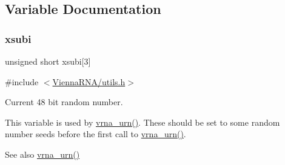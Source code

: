 \subsection{Variable Documentation}
\mbox{\label{group__utils_gaf9a866c8417afda7368bbac939ab3c47}} 
\subsubsection{\texorpdfstring{xsubi}{xsubi}}
{\footnotesize\ttfamily unsigned short xsubi\mbox{[}3\mbox{]}}



{\ttfamily \#include $<$\mbox{\hyperlink{utils_8h}{Vienna\+R\+N\+A/utils.\+h}}$>$}



Current 48 bit random number. 

This variable is used by \mbox{\hyperlink{group__utils_ga384e256ebb295d04a14426179db0dd6e}{vrna\+\_\+urn()}}. These should be set to some random number seeds before the first call to \mbox{\hyperlink{group__utils_ga384e256ebb295d04a14426179db0dd6e}{vrna\+\_\+urn()}}.

\begin{DoxySeeAlso}{See also}
\mbox{\hyperlink{group__utils_ga384e256ebb295d04a14426179db0dd6e}{vrna\+\_\+urn()}} 
\end{DoxySeeAlso}
